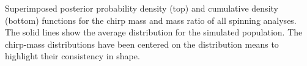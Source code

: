 \label{fig:mass_pdfs} Superimposed posterior probability density (top) and cumulative density (bottom) functions for the chirp mass and mass ratio of all spinning analyses.  The solid lines show the average distribution for the simulated population.  The chirp-mass distributions have been centered on the distribution means to highlight their consistency in shape.